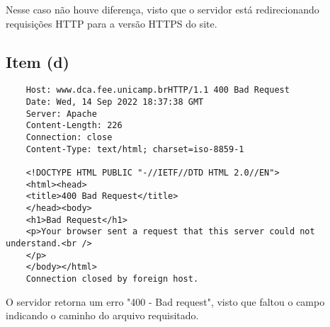\documentclass{article}
\begin{document}
Nesse caso não houve diferença, visto que o servidor está redirecionando requisições HTTP para a versão HTTPS do site. 

\subsection*{Item (d)}
\begin{verbatim}
    Host: www.dca.fee.unicamp.brHTTP/1.1 400 Bad Request
    Date: Wed, 14 Sep 2022 18:37:38 GMT
    Server: Apache
    Content-Length: 226
    Connection: close
    Content-Type: text/html; charset=iso-8859-1

    <!DOCTYPE HTML PUBLIC "-//IETF//DTD HTML 2.0//EN">
    <html><head>
    <title>400 Bad Request</title>
    </head><body>
    <h1>Bad Request</h1>
    <p>Your browser sent a request that this server could not understand.<br />
    </p>
    </body></html>
    Connection closed by foreign host.
\end{verbatim}

O servidor retorna um erro "400 - Bad request", visto que faltou o campo indicando o caminho do arquivo requisitado.
\end{document}
